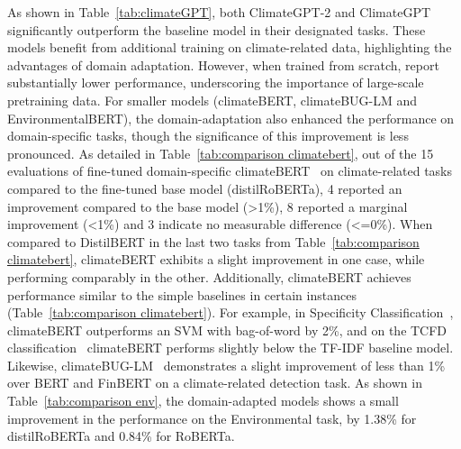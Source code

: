 


As shown in Table~\ref{tab:climateGPT}, both ClimateGPT-2 and ClimateGPT significantly outperform the baseline model in their designated tasks. These models benefit from additional training on climate-related data, highlighting the advantages of domain adaptation. However, when trained from scratch, \citet{thulke2024climategpt} report substantially lower performance, underscoring the importance of large-scale pretraining data.
For smaller models (climateBERT, climateBUG-LM and EnvironmentalBERT), the domain-adaptation also enhanced the performance on domain-specific tasks, though the significance of this improvement is less pronounced.
As detailed in Table~\ref{tab:comparison climatebert}, out of the 15 evaluations of fine-tuned domain-specific climateBERT~\cite{nicolas_webersinke_climatebert_2021} on climate-related tasks compared to the fine-tuned base model (distilRoBERTa), 4 reported an improvement compared to the base model (>1\%), 8 reported a marginal improvement (<1\%) and 3 indicate no measurable difference (<=0\%). %
When compared to DistilBERT in the last two tasks from Table~\ref{tab:comparison climatebert}, climateBERT exhibits a slight improvement in one case, while performing comparably in the other.
Additionally, climateBERT achieves performance similar to the simple baselines in certain instances (Table~\ref{tab:comparison climatebert}). 
For example, in Specificity Classification~\cite{bingler2023cheaptalkspecificitysentiment}, climateBERT outperforms an SVM with bag-of-word by 2\%, and on the TCFD classification~\cite{sampson_tcfd-nlp_nodate} climateBERT performs slightly below the TF-IDF baseline model. Likewise, climateBUG-LM~\cite{yu_climatebug_2024} demonstrates a slight improvement of less than 1\% over BERT and FinBERT on a climate-related detection task. %
As shown in Table~\ref{tab:comparison env}, the domain-adapted models shows a small improvement in the performance on the Environmental task, by 1.38\% for distilRoBERTa and 0.84\% for RoBERTa. 


